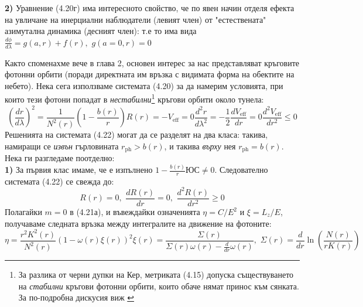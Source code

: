 \noindent\textbf{2)} Уравнение (4.20г) има интересното свойство, че по явен начин отделя ефекта на увличане на инерциални наблюдатели (левият член) от "естествената"$\,$ азимутална динамика (десният член): т.е то има вида $\frac{d\phi}{d\lambda} = g(a,r) + f(r),\,\, g(a = 0, r) = 0$\newpage

Както споменахме вече в глава 2, основен интерес за нас представляват кръговите фотонни орбити (поради директната им връзка с видимата форма на обектите на небето). Нека сега използваме системата (4.20) за да намерим условията, при които тези фотони попадат в \emph{нестабилни}\footnote{За разлика от черни дупки на Кер, метриката (4.15) допуска съществуването на \emph{стабилни} кръгови фотонни орбити, които обаче нямат принос към сянката. За по-подробна дискусия виж \cite{Gyulchev2018}} кръгови орбити около тунела:
\begin{subequations}
	\begin{equation}
	\left(\frac{dr}{d\lambda}\right)^2 = \frac{1}{N^2(r)}\left(1 - \frac{b(r)}{r}\right)R(r) = - V_\text{eff} = 0
	\end{equation}
	\begin{equation}
		\frac{d^2r}{d\lambda^2} = -\frac{1}{2}\frac{dV_{\text{eff}}}{dr} = 0
	\end{equation}
	\begin{equation}
		\frac{d^2V_\text{eff}}{dr^2} \le 0
	\end{equation}
\end{subequations}
Решенията на системата (4.22) могат да се разделят на два класа: такива, намиращи се \emph{извън} гърловината $r_{\text{ph}} > b(r)$, и такива \emph{върху} нея $r_\text{ph} = b(r)$. Нека ги разгледаме поотделно:\\
	
\noindent\textbf{1)} За първия клас имаме, че е изпълнено $1 - \frac{b(r)}{r}ЮС \ne 0$. Следователно системата (4.22) се свежда до:
	\begin{equation}
		R(r) = 0,\,\, \frac{dR(r)}{dr} = 0,\,\, \frac{d^2R(r)}{dr^2} \ge 0
	\end{equation}
	Полагайки $m = 0$ в (4.21а), и въвеждайки означенията $\eta = C / E^2$ и $\xi = L_z / E$, получаваме следната връзка между интегралите на движение на фотоните:
	\begin{subequations}
		\begin{equation}
			\eta = \frac{r^2K^2(r)}{N^2(r)}\left(1 - \omega(r)\xi(r)\right)^2
		\end{equation}
		\begin{equation}
			\xi(r) = \frac{\Sigma(r)}{\Sigma(r)\omega(r) - \frac{d}{dr}\omega(r)},\,\, \Sigma(r) = \frac{d}{dr}\ln\left(\frac{N(r)}{rK(r)}\right)
		\end{equation}
	\end{subequations}


